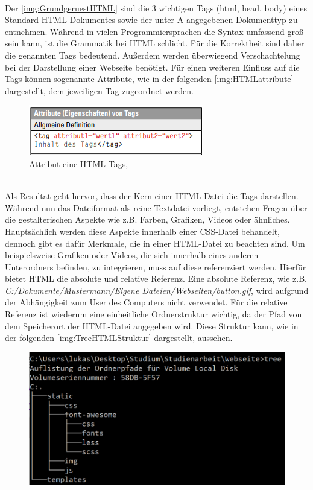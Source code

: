 \documentclass[a4paper,titlepage,halfparskip,12pt]{scrreprt}
\begin{document}
\begin{onehalfspacing}
\\Der \autoref{img:GrundgeruestHTML} sind die 3 wichtigen Tags (html, head, body) eines Standard \ac{HTML}-Dokumentes sowie der unter A angegebenen Dokumenttyp zu entnehmen. Während in vielen Programmiersprachen die Syntax umfassend groß sein kann, ist die Grammatik bei \ac{HTML} schlicht. Für die Korrektheit sind daher die genannten Tags bedeutend. Außerdem werden überwiegend Verschachtelung bei der Darstellung einer Webseite benötigt. Für einen weiteren Einfluss auf die Tags können sogenannte Attribute, wie in der folgenden \autoref{img:HTMLattribute} dargestellt, dem jeweiligen Tag zugeordnet werden. 
\begin{figure}[h]
	\centering
	\includegraphics[scale=2.5]{images/HTMLattribute}
	\caption{Attribut eine \ac{HTML}-Tags, \cite{buhler2017html5}}
	\label{img:HTMLattribute}
\end{figure}
\\Als Resultat geht hervor, dass der Kern einer \ac{HTML}-Datei die Tags darstellen. Während nun das Dateiformat als reine Textdatei vorliegt, entstehen Fragen über die gestalterischen Aspekte wie z.B. Farben, Grafiken, Videos oder ähnliches. Hauptsächlich werden diese Aspekte innerhalb einer \ac{CSS}-Datei behandelt, dennoch gibt es dafür Merkmale, die in einer \ac{HTML}-Datei zu beachten sind. Um beispielsweise Grafiken oder Videos, die sich innerhalb eines anderen Unterordners befinden, zu integrieren, muss auf diese referenziert werden. Hierfür bietet \ac{HTML} die absolute und relative Referenz. Eine absolute Referenz, wie z.B. \textit{C:/Dokumente/Mustermann/Eigene Dateien/Webseiten/button.gif}, wird aufgrund der Abhängigkeit zum User des Computers nicht verwendet. Für die relative Referenz ist wiederum eine einheitliche Ordnerstruktur wichtig, da der Pfad von dem Speicherort der \ac{HTML}-Datei angegeben wird. Diese Struktur kann, wie in der folgenden \autoref{img:TreeHTMLStruktur} dargestellt, aussehen.
\begin{figure}[h]
	\centering
	\includegraphics[scale=0.8]{images/TreeHTMLStruktur}

\end{figure}
\end{onehalfspacing}
\end{document}
